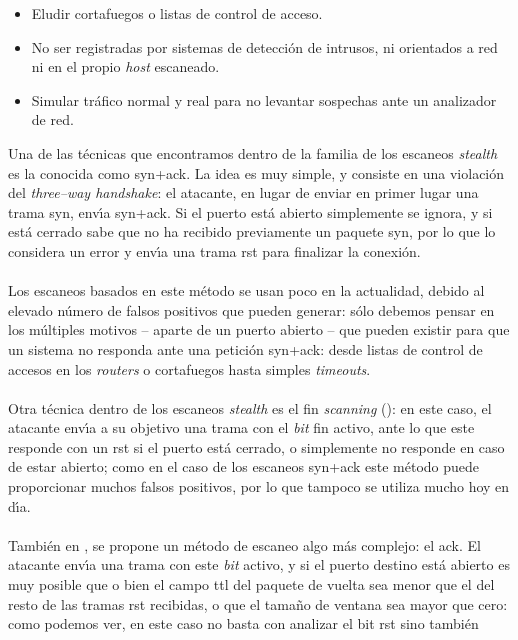 \begin{itemize}
\item Eludir cortafuegos o listas de control de acceso.
\item No ser registradas por sistemas de detecci\'on de intrusos, ni orientados
a red ni en el propio {\it host} escaneado.
\item Simular tr\'afico normal y real para no levantar sospechas ante un 
analizador de red.
\end{itemize}
Una de las t\'ecnicas que encontramos dentro de la familia de los escaneos {\it 
stealth} es la conocida como {\sc syn+ack}. La idea es muy simple, y consiste en
una violaci\'on del {\it three--way handshake}: el atacante, en lugar de enviar 
en primer lugar una trama {\sc syn}, env\'{\i}a {\sc syn+ack}. Si el puerto 
est\'a abierto simplemente se ignora, y si est\'a cerrado sabe que no ha 
recibido previamente un paquete {\sc syn}, por lo que lo considera un error y
env\'{\i}a una trama {\sc rst} para finalizar la conexi\'on.\\
\\Los escaneos basados en este m\'etodo se usan poco en la actualidad, debido
al elevado n\'umero de falsos positivos que pueden generar: s\'olo debemos 
pensar en los m\'ultiples motivos -- aparte de un puerto abierto -- que pueden
existir para que un sistema no responda ante una petici\'on {\sc syn+ack}: 
desde listas de control de accesos en los {\it routers} o cortafuegos hasta 
simples {\it timeouts}.\\
\\Otra t\'ecnica dentro de los escaneos {\it stealth} es el {\sc fin} {\it
scanning} (\cite{kn:mai96}): en este caso, el atacante env\'{\i}a a su objetivo 
una trama con el {\it bit} {\sc fin} activo, ante lo que este responde con un
{\sc rst} si el puerto est\'a cerrado, o simplemente no responde en caso de
estar abierto; como en el caso de los escaneos {\sc syn+ack} este m\'etodo puede
proporcionar muchos falsos positivos, por lo que tampoco se utiliza mucho hoy
en d\'{\i}a.\\
\\Tambi\'en en \cite{kn:mai96}, se propone un m\'etodo de escaneo algo m\'as
complejo: el {\sc ack}. El atacante env\'{\i}a una trama con este {\it bit}
activo, y si el puerto destino est\'a abierto es muy posible que o bien el 
campo {\sc ttl} del paquete de vuelta sea menor que el del resto de las tramas 
{\sc rst} recibidas, o que el tama\~no de ventana sea mayor que cero: como 
podemos ver, en este caso no basta con analizar el bit {\sc rst} sino tambi\'en
